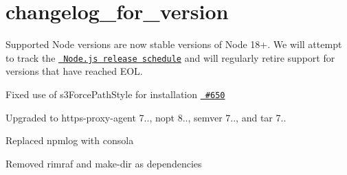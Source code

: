 \chapter{changelog\+\_\+for\+\_\+version}
\hypertarget{md_node__modules_2_0dmapbox_2node-pre-gyp_2changelog__for__version}{}\label{md_node__modules_2_0dmapbox_2node-pre-gyp_2changelog__for__version}

\begin{DoxyItemize}
\item Supported Node versions are now stable versions of Node 18+. We will attempt to track the \href{https://github.com/nodejs/release\#release-schedule}{\texttt{ Node.\+js release schedule}} and will regularly retire support for versions that have reached EOL.
\item Fixed use of {\ttfamily s3\+Force\+Path\+Style} for installation \href{https://github.com/mapbox/node-pre-gyp/pull/650}{\texttt{ \#650}}
\item Upgraded to https-\/proxy-\/agent 7.., nopt 8.., semver 7.., and tar 7..
\item Replaced npmlog with consola
\item Removed rimraf and make-\/dir as dependencies 
\end{DoxyItemize}